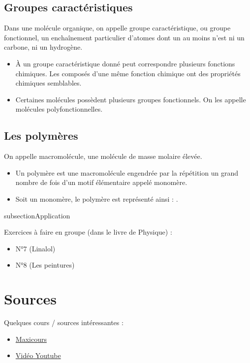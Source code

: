 \documentclass{article}
\begin{document}
\subsection{Groupes caractéristiques}

Dans une molécule organique, on appelle groupe caractéristique, ou groupe fonctionnel, un enchaînement particulier d’atomes dont un au moins n’est ni un carbone, ni un hydrogène.
\begin{itemize}
    \item À un groupe caractéristique donné peut correspondre plusieurs fonctions chimiques. Les composés d’une même fonction chimique ont des propriétés chimiques semblables.
    \item Certaines molécules possèdent plusieurs groupes fonctionnels. On les appelle molécules polyfonctionnelles.
\end{itemize}

\subsection{Les polymères}

On appelle macromolécule, une molécule de masse molaire élevée.
\begin{itemize}[noitemsep]
    \item Un polymère est une macromolécule engendrée par la répétition un grand nombre de fois d’un motif élémentaire appelé monomère.
    \item Soit  un monomère, le polymère est représenté ainsi : .
\end{itemize}

subsection{Application}

\begin{tcolorbox}[colback=blue!10!white, colframe=blue!75!black, title=Application : Structure électronique]
  Exercices à faire en groupe (dans le livre de Physique) : 
  \begin{itemize}[noitemsep]
    \item N°7 (Linalol)
    \item N°8 (Les peintures)
  \end{itemize}
\end{tcolorbox}


\section{Sources}

Quelques cours / sources intéressantes : 

\begin{itemize}[noitemsep]
  \item \href{https://www.maxicours.com/se/cours/etablir-le-schema-de-lewis-et-la-geometrie-d-une-molecule/}{Maxicours}
  \item \href{https://www.youtube.com/watch?v=bmV-Tbv2Me8&ab_channel=e-profs-PhysiqueChimie}{Vidéo Youtube}
\end{itemize}
\end{document}
